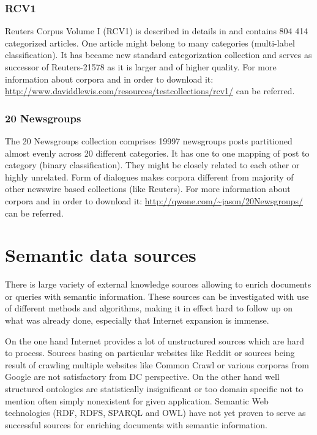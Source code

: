 \documentclass[a4paper, 12pt, oneside]{Thesis} %
\begin{document}
\subsection{RCV1} Reuters Corpus Volume I (RCV1) is described in details in \cite{lewis2004rcv1} and contains 804 414 categorized articles. One article might belong to many categories (multi-label classification). It has became new standard categorization collection and serves as successor of Reuters-21578 as it is larger and of higher quality. For more information about corpora and in order to download it:  \url{http://www.daviddlewis.com/resources/testcollections/rcv1/} can be referred.

\subsection{20 Newsgroups} The 20 Newsgroups collection comprises 19997 newsgroups posts partitioned almost evenly across 20 different categories. It has one to one mapping of post to category (binary classification). They might be closely related to each other or highly unrelated. Form of dialogues makes corpora different from majority of other newswire based collections (like Reuters). For more information about corpora and in order to download it: \url{http://qwone.com/~jason/20Newsgroups/} can be referred.

\chapter{Semantic data sources} There is large variety of external knowledge sources allowing to enrich documents or queries with semantic information. These sources can be investigated with use of different methods and algorithms, making it in effect hard to follow up on what was already done, especially that Internet expansion is immense.

On the one hand Internet provides a lot of unstructured sources which are hard to process. Sources basing on particular websites like Reddit or sources being result of crawling multiple websites like Common Crawl or various corporas from Google are not satisfactory from DC perspective. On the other hand well structured ontologies are statistically insignificant or too domain specific not to mention often simply nonexistent for given application. Semantic Web technologies (RDF, RDFS, SPARQL and OWL) have not yet proven to serve as successful sources for enriching documents with semantic information.
\end{document}

